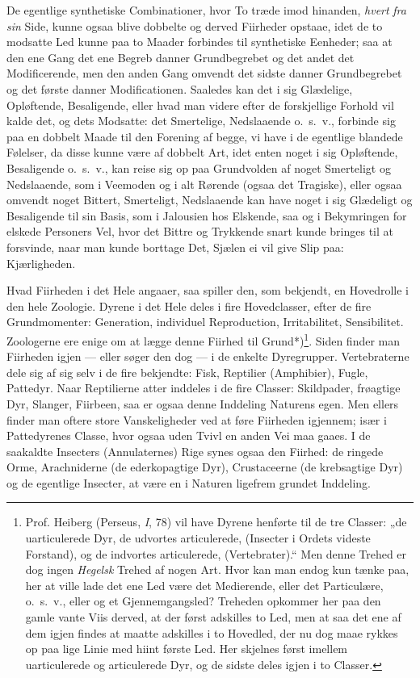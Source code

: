 \documentclass[12pt,a4paper]{book}
\newcommand{\apage}[1]{\marginnote{\footnotesize\textit{[#1]}}}
\begin{document}
De egentlige synthetiske Combinationer, hvor To træde imod hinanden, \emph{hvert} \emph{fra
sin} Side, kunne ogsaa blive dobbelte og derved Fiirheder opstaae, idet de to
modsatte Led kunne paa to Maader forbindes til synthetiske Eenheder; saa at den
ene Gang det ene Begreb danner Grundbegrebet og det andet det Modificerende, men
den anden Gang omvendt det sidste danner Grundbegrebet og det første danner
Modificationen. Saaledes kan det i sig Glædelige, Opløftende, Besaligende, eller
hvad man videre efter de forskjellige Forhold vil kalde det, og dets Modsatte:
det Smertelige, Nedslaaende o.\ s.\ v., forbinde sig paa en dobbelt Maade til den
Forening af begge, vi have i de egentlige blandede Følelser, da disse kunne være
af dobbelt Art, idet \apage{136} enten noget i sig Opløftende, Besaligende o.\ s.\ v., kan
reise sig op paa Grundvolden af noget Smerteligt og Nedslaaende, som i Veemoden
og i alt Rørende (ogsaa det Tragiske), eller ogsaa omvendt noget Bittert,
Smerteligt, Nedslaaende kan have noget i sig Glædeligt og Besaligende til sin
Basis, som i Jalousien hos Elskende, saa og i Bekymringen for elskede Personers
Vel, hvor det Bittre og Trykkende snart kunde bringes til at forsvinde, naar man
kunde borttage Det, Sjælen ei vil give Slip paa: Kjærligheden.

Hvad Fiirheden i det Hele angaaer, saa spiller den, som bekjendt, en Hovedrolle
i den hele Zoologie. Dyrene i det Hele deles i fire Hovedclasser, efter de fire
Grundmomenter: Generation, individuel Reproduction, Irritabilitet,
Sensibilitet. Zoologerne ere enige om at lægge denne Fiirhed til
Grund*)\footnote{Prof. Heiberg (Perseus, \textit{I}, 78) vil have Dyrene henførte til de
tre Classer: „de uarticulerede Dyr, de udvortes articulerede, (Insecter i Ordets
videste Forstand), og de indvortes articulerede, (Vertebrater).“ Men denne
Trehed er dog ingen \emph{Hegelsk} Trehed af nogen Art. Hvor kan man endog kun tænke
paa, her at ville lade det ene Led være det Medierende, eller det Particulære,
o.\ s.\ v., eller og et Gjennemgangsled? Treheden opkommer her paa den gamle
vante Viis derved, at der først adskilles to Led, men at saa det ene af dem
igjen findes at maatte adskilles i to Hovedled, der nu dog maae rykkes op paa
lige Linie med hiint første Led. Her skjelnes først imellem uarticulerede og
articulerede Dyr, og de sidste deles igjen i to Classer.}. Siden finder man
Fiirheden igjen --- eller søger den dog --- i de enkelte Dyregrupper.
Vertebraterne dele sig af sig selv i de fire bekjendte: Fisk, Reptilier
(Amphibier), Fugle, Pattedyr. Naar Reptilierne atter inddeles i de fire Classer:
Skildpader, frøagtige Dyr, Slanger, Fiirbeen, saa er ogsaa denne Inddeling
Naturens egen. Men ellers finder man oftere store Vanskeligheder ved at føre
Fiirheden igjennem; især i Pattedyrenes Classe, hvor ogsaa uden Tvivl en anden
Vei maa gaaes. I de saakaldte Insecters \apage{137} (Annulaternes) Rige synes ogsaa den
Fiirhed: de ringede Orme, Arachniderne (de ederkopagtige Dyr), Crustaceerne (de
krebsagtige Dyr) og de egentlige Insecter, at være en i Naturen ligefrem grundet
Inddeling.
\end{document}
